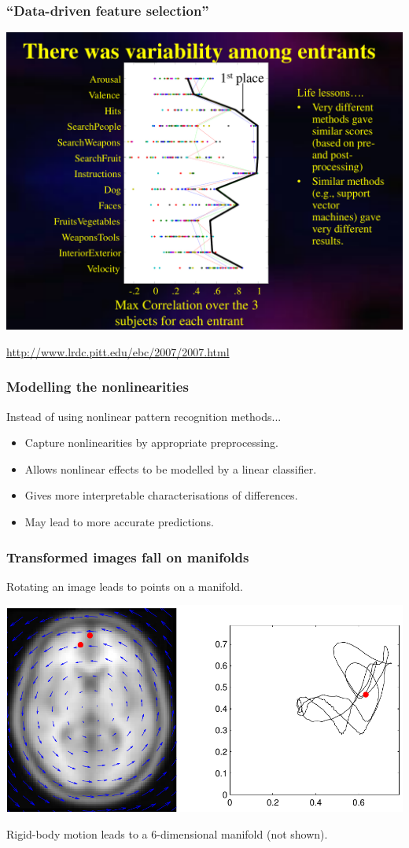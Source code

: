 \begin{frame}
\frametitle{``Data-driven feature selection''}
\begin{center}
\includegraphics[height=0.5\textwidth]{pbaic2007_2}\par
\url{http://www.lrdc.pitt.edu/ebc/2007/2007.html}\par
\end{center}
\end{frame}




\begin{frame}
\frametitle{Modelling the nonlinearities}
Instead of using nonlinear pattern recognition methods...
\begin{itemize}
\item Capture nonlinearities by appropriate preprocessing.
\item Allows nonlinear effects to be modelled by a linear classifier.
\item Gives more interpretable characterisations of differences.
\item May lead to more accurate predictions.
\end{itemize}
\end{frame}

\begin{frame}
\frametitle{Transformed images fall on manifolds}
Rotating an image leads to points on a manifold.\par
\includegraphics[width=\textwidth]{manifold_rotation}

Rigid-body motion leads to a 6-dimensional manifold (not shown).

\end{frame}

